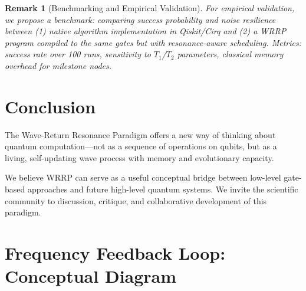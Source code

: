 \documentclass[11pt,a4paper]{article}
\newtheorem{remark}{Remark}
\begin{document}
\begin{remark}[Benchmarking and Empirical Validation]
For empirical validation, we propose a benchmark: comparing success probability and noise resilience between (1) native algorithm implementation in Qiskit/Cirq and (2) a WRRP program compiled to the same gates but with resonance-aware scheduling. Metrics: success rate over 100 runs, sensitivity to $T_1$/$T_2$ parameters, classical memory overhead for milestone nodes.
\end{remark}

\section{Conclusion}

The Wave-Return Resonance Paradigm offers a new way of thinking about quantum computation---not as a sequence of operations on qubits, but as a living, self-updating wave process with memory and evolutionary capacity.

We believe WRRP can serve as a useful conceptual bridge between low-level gate-based approaches and future high-level quantum systems. We invite the scientific community to discussion, critique, and collaborative development of this paradigm.

\appendix
\section{Frequency Feedback Loop: Conceptual Diagram}
\end{document}
